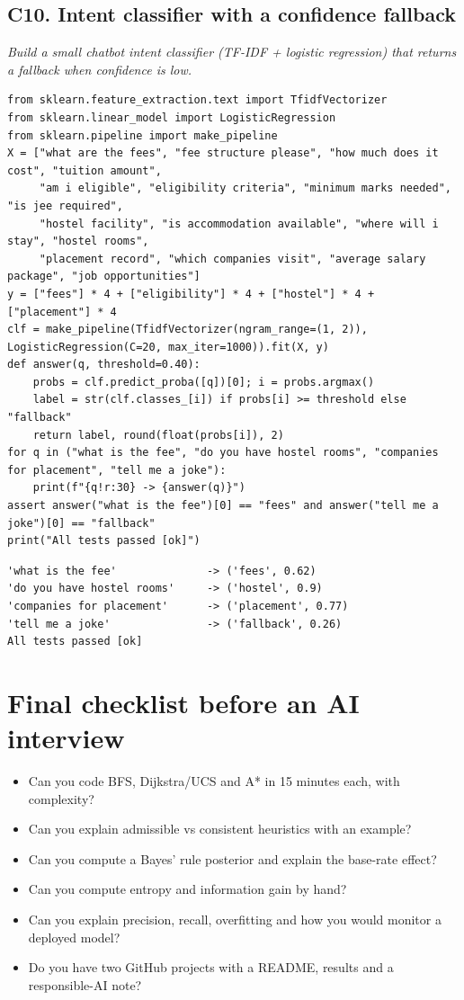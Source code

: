 \documentclass[11pt]{article}
\begin{document}
\subsection*{C10. Intent classifier with a confidence fallback \hfill{}}
\textit{Build a small chatbot intent classifier (TF-IDF + logistic regression) that returns a fallback when confidence is low.}
\begin{lstlisting}[style=py]
from sklearn.feature_extraction.text import TfidfVectorizer
from sklearn.linear_model import LogisticRegression
from sklearn.pipeline import make_pipeline
X = ["what are the fees", "fee structure please", "how much does it cost", "tuition amount",
     "am i eligible", "eligibility criteria", "minimum marks needed", "is jee required",
     "hostel facility", "is accommodation available", "where will i stay", "hostel rooms",
     "placement record", "which companies visit", "average salary package", "job opportunities"]
y = ["fees"] * 4 + ["eligibility"] * 4 + ["hostel"] * 4 + ["placement"] * 4
clf = make_pipeline(TfidfVectorizer(ngram_range=(1, 2)), LogisticRegression(C=20, max_iter=1000)).fit(X, y)
def answer(q, threshold=0.40):
    probs = clf.predict_proba([q])[0]; i = probs.argmax()
    label = str(clf.classes_[i]) if probs[i] >= threshold else "fallback"
    return label, round(float(probs[i]), 2)
for q in ("what is the fee", "do you have hostel rooms", "companies for placement", "tell me a joke"):
    print(f"{q!r:30} -> {answer(q)}")
assert answer("what is the fee")[0] == "fees" and answer("tell me a joke")[0] == "fallback"
print("All tests passed [ok]")
\end{lstlisting}
\begin{lstlisting}[style=out]
'what is the fee'              -> ('fees', 0.62)
'do you have hostel rooms'     -> ('hostel', 0.9)
'companies for placement'      -> ('placement', 0.77)
'tell me a joke'               -> ('fallback', 0.26)
All tests passed [ok]
\end{lstlisting}
\section*{Final checklist before an AI interview}
\begin{itemize}\item Can you code BFS, Dijkstra/UCS and A* in 15 minutes each, with complexity?
\item Can you explain admissible vs consistent heuristics with an example?
\item Can you compute a Bayes' rule posterior and explain the base-rate effect?
\item Can you compute entropy and information gain by hand?
\item Can you explain precision, recall, overfitting and how you would monitor a deployed model?
\item Do you have two GitHub projects with a README, results and a responsible-AI note?\end{itemize}
\end{document}
